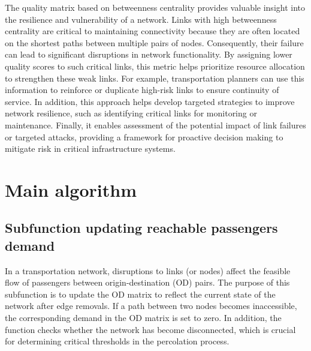 \documentclass[
  letterpaper,
  DIV=11,
  numbers=noendperiod]{scrartcl}
\begin{document}
The quality matrix based on betweenness centrality provides valuable
insight into the resilience and vulnerability of a network. Links with
high betweenness centrality are critical to maintaining connectivity
because they are often located on the shortest paths between multiple
pairs of nodes. Consequently, their failure can lead to significant
disruptions in network functionality. By assigning lower quality scores
to such critical links, this metric helps prioritize resource allocation
to strengthen these weak links. For example, transportation planners can
use this information to reinforce or duplicate high-risk links to ensure
continuity of service. In addition, this approach helps develop targeted
strategies to improve network resilience, such as identifying critical
links for monitoring or maintenance. Finally, it enables assessment of
the potential impact of link failures or targeted attacks, providing a
framework for proactive decision making to mitigate risk in critical
infrastructure systems.

\section{Main algorithm}\label{main-algorithm}

\subsection{Subfunction updating reachable passengers
demand}\label{subfunction-updating-reachable-passengers-demand}

In a transportation network, disruptions to links (or nodes) affect the
feasible flow of passengers between origin-destination (OD) pairs. The
purpose of this subfunction is to update the OD matrix to reflect the
current state of the network after edge removals. If a path between two
nodes becomes inaccessible, the corresponding demand in the OD matrix is
set to zero. In addition, the function checks whether the network has
become disconnected, which is crucial for determining critical
thresholds in the percolation process.
\end{document}

